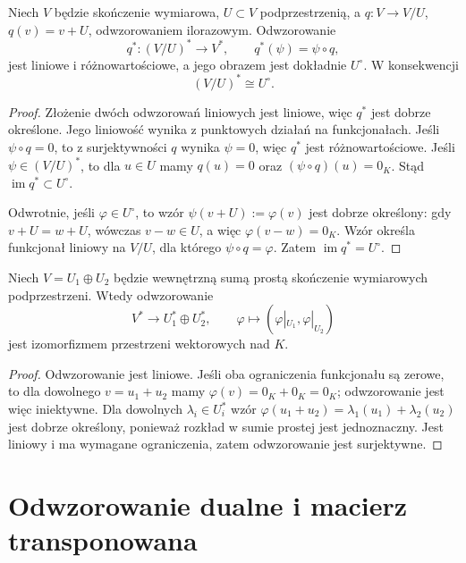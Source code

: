\begin{twierdzenie}
\label{thm:lin7-dual-ilorazu}
Niech \(V\) będzie skończenie wymiarowa,
\(U\subset V\) podprzestrzenią,
a \(q\colon V\to V/U\),
\(q(v)=v+U\), odwzorowaniem ilorazowym.
Odwzorowanie
\[
 q^*\colon (V/U)^*\longrightarrow V^*,
 \qquad q^*(\psi)=\psi\circ q,
\]
jest liniowe i różnowartościowe,
a jego obrazem jest dokładnie
\(U^\circ\).
W konsekwencji
\[
 (V/U)^*\cong U^\circ.
\]
\end{twierdzenie}
\begin{proof}
Złożenie dwóch odwzorowań liniowych
jest liniowe, więc \(q^*\)
jest dobrze określone.
Jego liniowość wynika
z punktowych działań na funkcjonałach.
Jeśli \(\psi\circ q=0\),
to z surjektywności \(q\)
wynika \(\psi=0\), więc \(q^*\)
jest różnowartościowe.
Jeśli \(\psi\in(V/U)^*\),
to dla \(u\in U\) mamy \(q(u)=0\)
oraz \((\psi\circ q)(u)=0_K\).
Stąd \(\operatorname{im}q^*\subset U^\circ\).

Odwrotnie, jeśli
\(\varphi\in U^\circ\),
to wzór
\(\psi(v+U):=\varphi(v)\)
jest dobrze określony:
gdy \(v+U=w+U\), wówczas
\(v-w\in U\), a więc
\(\varphi(v-w)=0_K\).
Wzór określa funkcjonał liniowy
na \(V/U\), dla którego
\(\psi\circ q=\varphi\).
Zatem \(\operatorname{im}q^*=U^\circ\).
\end{proof}

\begin{wniosek}
\label{cor:lin7-dual-sumy-prostej}
Niech \(V=U_1\oplus U_2\)
będzie wewnętrzną sumą prostą
skończenie wymiarowych podprzestrzeni.
Wtedy odwzorowanie
\[
 V^*\longrightarrow U_1^*\oplus U_2^*,
 \qquad
 \varphi\longmapsto
   (\varphi|_{U_1},\varphi|_{U_2})
\]
jest izomorfizmem przestrzeni
wektorowych nad \(K\).
\end{wniosek}
\begin{proof}
Odwzorowanie jest liniowe.
Jeśli oba ograniczenia funkcjonału
są zerowe, to dla dowolnego
\(v=u_1+u_2\) mamy
\(\varphi(v)=0_K+0_K=0_K\);
odwzorowanie jest więc iniektywne.
Dla dowolnych
\(\lambda_i\in U_i^*\)
wzór
\(\varphi(u_1+u_2)=
\lambda_1(u_1)+\lambda_2(u_2)\)
jest dobrze określony, ponieważ
rozkład w sumie prostej jest
jednoznaczny. Jest liniowy i
ma wymagane ograniczenia, zatem
odwzorowanie jest surjektywne.
\end{proof}

\section{Odwzorowanie dualne i macierz transponowana}
\label{sec:lin7-odwzorowanie-dualne}

